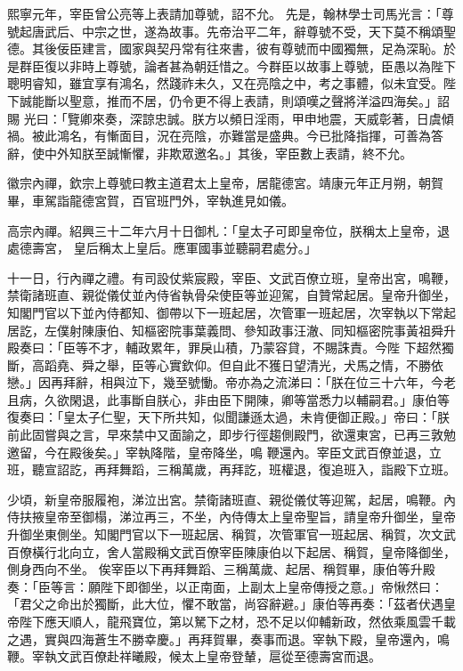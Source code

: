 \begin{pinyinscope}
 熙寧元年，宰臣曾公亮等上表請加尊號，詔不允。
 先是，翰林學士司馬光言：「尊號起唐武后、中宗之世，遂為故事。先帝治平二年，辭尊號不受，天下莫不稱頌聖德。其後佞臣建言，國家與契丹常有往來書，彼有尊號而中國獨無，足為深恥。於是群臣復以非時上尊號，論者甚為朝廷惜之。今群臣以故事上尊號，臣愚以為陛下聰明睿知，雖宜享有鴻名，然踐祚未久，又在亮陰之中，考之事體，似未宜受。陛下誠能斷以聖意，推而不居，仍令更不得上表請，則頌嘆之聲將洋溢四海矣。」詔賜
 光曰：「覽卿來奏，深諒忠誠。朕方以頻日淫雨，甲申地震，天威彰著，日虞傾禍。被此鴻名，有慚面目，況在亮陰，亦難當是盛典。今已批降指揮，可善為答辭，使中外知朕至誠慚懼，非欺眾邀名。」其後，宰臣數上表請，終不允。



 徽宗內禪，欽宗上尊號曰教主道君太上皇帝，居龍德宮。靖康元年正月朔，朝賀畢，車駕詣龍德宮賀，百官班門外，宰執進見如儀。



 高宗內禪。紹興三十二年六月十日御札：「皇太子可即皇帝位，朕稱太上皇帝，退處德壽宮，
 皇后稱太上皇后。應軍國事並聽嗣君處分。」



 十一日，行內禪之禮。有司設仗紫宸殿，宰臣、文武百僚立班，皇帝出宮，鳴鞭，禁衛諸班直、親從儀仗並內侍省執骨朵使臣等並迎駕，自贊常起居。皇帝升御坐，知閣門官以下並內侍都知、御帶以下一班起居，次管軍一班起居，次宰執以下常起居訖，左僕射陳康伯、知樞密院事葉義問、參知政事汪澈、同知樞密院事黃祖舜升殿奏曰：「臣等不才，輔政累年，罪戾山積，乃蒙容貸，不賜誅責。今陛
 下超然獨斷，高蹈堯、舜之舉，臣等心實欽仰。但自此不獲日望清光，犬馬之情，不勝依戀。」因再拜辭，相與泣下，幾至號慟。帝亦為之流涕曰：「朕在位三十六年，今老且病，久欲閑退，此事斷自朕心，非由臣下開陳，卿等當悉力以輔嗣君。」康伯等復奏曰：「皇太子仁聖，天下所共知，似聞謙遜太過，未肯便御正殿。」帝曰：「朕前此固嘗與之言，早來禁中又面諭之，即步行徑趨側殿門，欲還東宮，已再三敦勉邀留，今在殿後矣。」宰執降階，皇帝降坐，鳴
 鞭還內。宰臣文武百僚並退，立班，聽宣詔訖，再拜舞蹈，三稱萬歲，再拜訖，班權退，復追班入，詣殿下立班。



 少頃，新皇帝服履袍，涕泣出宮。禁衛諸班直、親從儀仗等迎駕，起居，鳴鞭。內侍扶掖皇帝至御榻，涕泣再三，不坐，內侍傳太上皇帝聖旨，請皇帝升御坐，皇帝升御坐東側坐。知閣門官以下一班起居、稱賀，次管軍官一班起居、稱賀，次文武百僚橫行北向立，舍人當殿稱文武百僚宰臣陳康伯以下起居、稱賀，皇帝降御坐，側身西向不坐。
 俟宰臣以下再拜舞蹈、三稱萬歲、起居、稱賀畢，康伯等升殿奏：「臣等言：願陛下即御坐，以正南面，上副太上皇帝傳授之意。」帝愀然曰：「君父之命出於獨斷，此大位，懼不敢當，尚容辭避。」康伯等再奏：「茲者伏遇皇帝陛下應天順人，龍飛寶位，第以駑下之材，恐不足以仰輔新政，然依乘風雲千載之遇，實與四海蒼生不勝幸慶。」再拜賀畢，奏事而退。宰執下殿，皇帝還內，鳴鞭。宰執文武百僚赴祥曦殿，候太上皇帝登輦，扈從至德壽宮而退。




\end{pinyinscope}
